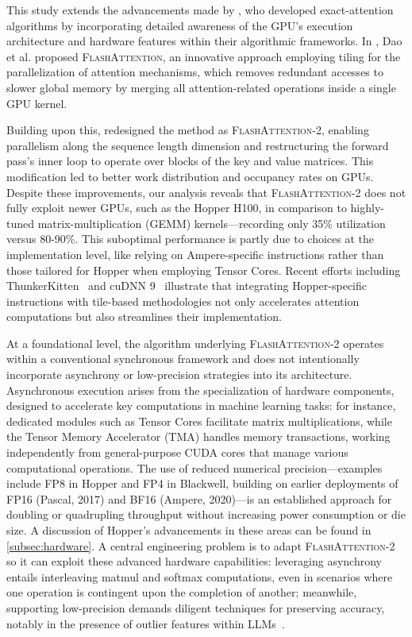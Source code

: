 This study extends the advancements made by \citet{dao2022flashattention}, who developed exact-attention algorithms by incorporating detailed awareness of the GPU's execution architecture and hardware features within their algorithmic frameworks. In \citep{dao2022flashattention}, Dao et al. proposed \textsc{FlashAttention}, an innovative approach employing tiling for the parallelization of attention mechanisms, which removes redundant accesses to slower global memory by merging all attention-related operations inside a single GPU kernel. 

Building upon this, \citet{dao2023flashattention2} redesigned the method as \textsc{FlashAttention-2}, enabling parallelism along the sequence length dimension and restructuring the forward pass's inner loop to operate over blocks of the key and value matrices. This modification led to better work distribution and occupancy rates on GPUs. Despite these improvements, our analysis reveals that \textsc{FlashAttention-2} does not fully exploit newer GPUs, such as the Hopper H100, in comparison to highly-tuned matrix-multiplication (GEMM) kernels—recording only 35\% utilization versus 80-90\%. This suboptimal performance is partly due to choices at the implementation level, like relying on Ampere-specific instructions rather than those tailored for Hopper when employing Tensor Cores. Recent efforts including ThunkerKitten~\citep{spector2024thunder} and cuDNN 9~\citep{cudnn9} illustrate that integrating Hopper-specific instructions with tile-based methodologies not only accelerates attention computations but also streamlines their implementation.

At a foundational level, the algorithm underlying \textsc{FlashAttention-2} operates within a conventional synchronous framework and does not intentionally incorporate asynchrony or low-precision strategies into its architecture. Asynchronous execution arises from the specialization of hardware components, designed to accelerate key computations in machine learning tasks: for instance, dedicated modules such as Tensor Cores facilitate matrix multiplications, while the Tensor Memory Accelerator (TMA) handles memory transactions, working independently from general-purpose CUDA cores that manage various computational operations. The use of reduced numerical precision—examples include FP8 in Hopper and FP4 in Blackwell, building on earlier deployments of FP16 (Pascal, 2017) and BF16 (Ampere, 2020)—is an established approach for doubling or quadrupling throughput without increasing power consumption or die size. A discussion of Hopper’s advancements in these areas can be found in \cref{subsec:hardware}.
A central engineering problem is to adapt \textsc{FlashAttention-2} so it can exploit these advanced hardware capabilities: leveraging asynchrony entails interleaving matmul and softmax computations, even in scenarios where one operation is contingent upon the completion of another; meanwhile, supporting low-precision demands diligent techniques for preserving accuracy, notably in the presence of outlier features within LLMs~\citep{dettmers2208llm, sun2024massive}.


